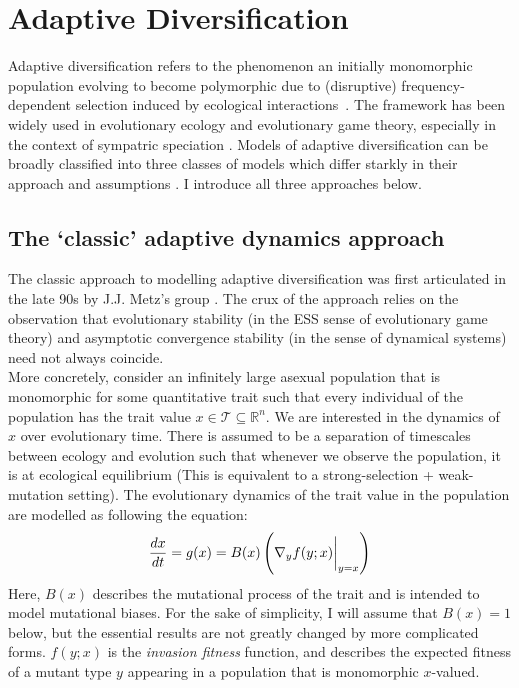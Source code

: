 \chapter{Adaptive Diversification}
Adaptive diversification refers to the phenomenon an initially monomorphic population evolving to become polymorphic due to (disruptive) frequency-dependent selection induced by ecological interactions~\citep{doebeli_adaptive_2011}. The framework has been widely used in evolutionary ecology and evolutionary game theory, especially in the context of sympatric speciation \citep{dieckmann_origin_1999}. Models of adaptive diversification can be broadly classified into three classes of models which differ starkly in their approach and assumptions \citep{doebeli_adaptive_2011}. I introduce all three approaches below.

\section{The `classic' adaptive dynamics approach}
The classic approach to modelling adaptive diversification was first articulated in the late 90s by J.J. Metz's group \citep{geritz_evolutionarily_1998}. The crux of the approach relies on the observation that evolutionary stability (in the ESS sense of evolutionary game theory) and asymptotic convergence stability (in the sense of dynamical systems) need not always coincide.\\
More concretely, consider an infinitely large asexual population that is monomorphic for some quantitative trait such that every individual of the population has the trait value $x \in \mathcal{T} \subseteq \mathbb{R}^n$. We are interested in the dynamics of $x$ over evolutionary time. There is assumed to be a separation of timescales between ecology and evolution such that whenever we observe the population, it is at ecological equilibrium (This is equivalent to a strong-selection + weak-mutation setting). The evolutionary dynamics of the trait value in the population are modelled as following the equation:
\begin{equation}
	\label{AD_canonical_eqn}
	\frac{dx}{dt} = g(x) = B(x)\left(\nabla_y f(y;x) \bigg{|}_{y=x}\right)
\end{equation}
Here, $B(x)$ describes the mutational process of the trait and is intended to model mutational biases. For the sake of simplicity, I will assume that $B(x) = 1$ below, but the essential results are not greatly changed by more complicated forms. $f(y;x)$ is the \emph{invasion fitness} function, and describes the expected fitness of a mutant type $y$ appearing in a population that is monomorphic $x$-valued.%
